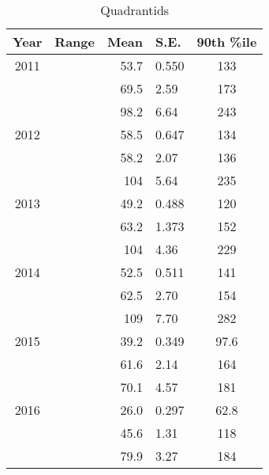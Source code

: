 \begin{table}[h!]
	\centering
	\begin{tabular}{|c|c|r@{ \,$\pm$\, }l|c|}
		\hline 
		Year & Range & Mean & S.E. & 90th \%ile\\ 
		\hline 
		2011 & & 53.7 & 0.550 & 133   \\ 
		\hline 
		& & 69.5 & 2.59 & 173   \\ 
		\hline 
		& & 98.2 & 6.64 & 243   \\ 
		\hline 
		2012 & & 58.5 & 0.647 & 134   \\ 
		\hline 
		& & 58.2 & 2.07 & 136   \\ 
		\hline 
		& & 104 & 5.64 & 235   \\ 
		\hline 
		2013 & & 49.2 & 0.488 & 120   \\ 
		\hline 
		& & 63.2 & 1.373 & 152   \\ 
		\hline 
		& & 104 & 4.36 & 229   \\ 
		\hline 
		2014 & & 52.5 & 0.511 & 141   \\ 
		\hline 
		& & 62.5 & 2.70 & 154   \\ 
		\hline 
		& & 109 & 7.70 & 282  \\ 
		\hline 
		2015 & & 39.2 & 0.349 & 97.6   \\ 
		\hline 
		& & 61.6 & 2.14 & 164   \\ 
		\hline 
		& & 70.1 & 4.57 & 181   \\ 
		\hline
		2016 & & 26.0 & 0.297 & 62.8	\\
		\hline 
		& & 45.6 & 1.31 & 118   \\ 
		\hline 
		& & 79.9 & 3.27 & 184   \\ 
		\hline 
	\end{tabular}
	\caption{Quadrantids} 
\end{table}

